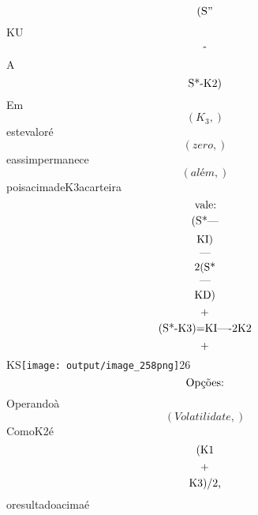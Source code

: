 \documentclass{article}
\begin{document}
\begin{equation}
$(S”$
\end{equation}KU\begin{equation}
$-$
\end{equation}A\begin{equation}
$S*-K2)$
\end{equation}Em\begin{equation}
\left( K_{3},\right)
\end{equation}estevaloré\begin{equation}
\left( zero,\right)
\end{equation}eassimpermanece\begin{equation}
\left( além,\right)
\end{equation}poisacimadeK3acarteira\begin{equation}
$vale:$
\end{equation}\begin{equation}
$(S*—$
\end{equation}\begin{equation}
$KI)$
\end{equation}\begin{equation}
—
\end{equation}\begin{equation}
$2(S*$
\end{equation}\begin{equation}
—
\end{equation}\begin{equation}
$KD)$
\end{equation}\begin{equation}
$+$
\end{equation}\begin{equation}
$(S*-K3)=KI—-2K2$
\end{equation}\begin{equation}
$+$
\end{equation}KS\texttt{[image: output/image\_258png]}26\begin{equation}
$Opções:$
\end{equation}Operandoà\begin{equation}
\left( Volatilidate,\right)
\end{equation}ComoK2é\begin{equation}
$(K1$
\end{equation}\begin{equation}
$+$
\end{equation}\begin{equation}
$K3)/2,$
\end{equation}oresultadoacimaé\begin{equation}

\end{equation}
\end{document}
